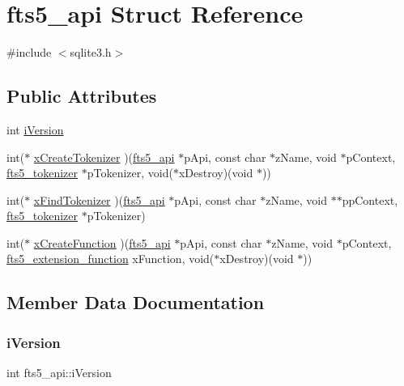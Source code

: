 \hypertarget{structfts5__api}{}\section{fts5\+\_\+api Struct Reference}
\label{structfts5__api}


{\ttfamily \#include $<$sqlite3.\+h$>$}

\subsection*{Public Attributes}
\begin{DoxyCompactItemize}
\item 
int \mbox{\hyperlink{structfts5__api_a3c338289abb33e1805da870172956a7c}{i\+Version}}
\item 
int($\ast$ \mbox{\hyperlink{structfts5__api_a7fe3663f85eab512d5c461e1674da129}{x\+Create\+Tokenizer}} )(\mbox{\hyperlink{structfts5__api}{fts5\+\_\+api}} $\ast$p\+Api, const char $\ast$z\+Name, void $\ast$p\+Context, \mbox{\hyperlink{structfts5__tokenizer}{fts5\+\_\+tokenizer}} $\ast$p\+Tokenizer, void($\ast$x\+Destroy)(void $\ast$))
\item 
int($\ast$ \mbox{\hyperlink{structfts5__api_a20a23794695fa61e2892ad1243b16b67}{x\+Find\+Tokenizer}} )(\mbox{\hyperlink{structfts5__api}{fts5\+\_\+api}} $\ast$p\+Api, const char $\ast$z\+Name, void $\ast$$\ast$pp\+Context, \mbox{\hyperlink{structfts5__tokenizer}{fts5\+\_\+tokenizer}} $\ast$p\+Tokenizer)
\item 
int($\ast$ \mbox{\hyperlink{structfts5__api_acf1a0612be3b91b908f38ecbc6735d17}{x\+Create\+Function}} )(\mbox{\hyperlink{structfts5__api}{fts5\+\_\+api}} $\ast$p\+Api, const char $\ast$z\+Name, void $\ast$p\+Context, \mbox{\hyperlink{sqlite3_8h_a8a1df7b5a066b194f490be5936e85c17}{fts5\+\_\+extension\+\_\+function}} x\+Function, void($\ast$x\+Destroy)(void $\ast$))
\end{DoxyCompactItemize}


\subsection{Member Data Documentation}
\mbox{\label{structfts5__api_a3c338289abb33e1805da870172956a7c}} 
\subsubsection{\texorpdfstring{iVersion}{iVersion}}
{\footnotesize\ttfamily int fts5\+\_\+api\+::i\+Version}

